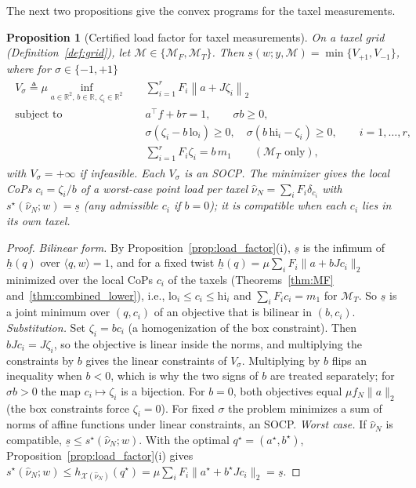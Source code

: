 \documentclass[11pt,a4paper]{article}
\theoremstyle{plain}
\newtheorem{proposition}[theorem]{Proposition}
\newcommand{\R}{\mathbb{R}}
\newcommand{\X}{\mathcal X}
\begin{document}
The next two propositions give the convex programs for the taxel measurements.

\begin{proposition}[Certified load factor for taxel measurements]
\label{prop:load_factor_lower}
    On a taxel grid (Definition~\ref{def:grid}), let $\mathcal M\in\{\mathcal M_F,\mathcal M_T\}$. Then $\underline s(w;y,\mathcal M)=\min\{V_{+1},V_{-1}\}$, where for $\sigma\in\{-1,+1\}$
    \begin{align}
        \boxed{
        \begin{aligned}
        V_\sigma\triangleq\mu\inf_{a\in\R^2,\,b\in\R,\,\zeta_i\in\R^2}\quad&\sum_{i=1}^rF_i\left\|a+J\zeta_i\right\|_2\\
        \text{subject to}\quad&a^\top f+b\tau=1,\qquad\sigma b\ge0,\\
        &\sigma\left(\zeta_i-b\,\mathrm{lo}_i\right)\ge0,\quad\sigma\left(b\,\mathrm{hi}_i-\zeta_i\right)\ge0,\qquad i=1,\ldots,r,\\
        &\textstyle\sum_{i=1}^rF_i\zeta_i=b\,m_1\qquad(\mathcal M_T\text{ only}),
        \end{aligned}}
    \end{align}
    with $V_\sigma=+\infty$ if infeasible. Each $V_\sigma$ is an SOCP. The minimizer gives the local CoPs $c_i=\zeta_i/b$ of a worst-case point load per taxel $\hat\nu_N=\sum_iF_i\delta_{c_i}$ with
    $s^\star(\hat\nu_N;w)=\underline s$ (any admissible $c_i$ if $b=0$); it is compatible when each $c_i$ lies in its own taxel.
\end{proposition}
\begin{proof}
    \emph{Bilinear form.} By Proposition~\ref{prop:load_factor}(i), $\underline s$ is the infimum of $\underline h(q)$ over $\langle q,w\rangle=1$, and for a fixed twist $\underline h(q)=\mu\sum_iF_i\|a+bJc_i\|_2$ minimized
    over the local CoPs $c_i$ of the taxels (Theorems~\ref{thm:MF} and~\ref{thm:combined_lower}), i.e., $\mathrm{lo}_i\le c_i\le\mathrm{hi}_i$ and $\sum_iF_ic_i=m_1$ for $\mathcal M_T$.
    So $\underline s$ is a joint minimum over $(q,c_i)$ of an objective that is bilinear in $(b,c_i)$.
    \emph{Substitution.} Set $\zeta_i=bc_i$ (a homogenization of the box constraint). Then $bJc_i=J\zeta_i$, so the objective is linear inside the norms, and multiplying the constraints by $b$ gives the
    linear constraints of $V_\sigma$. Multiplying by $b$ flips an inequality when $b<0$, which is why the two signs of $b$ are treated separately; for $\sigma b>0$ the map $c_i\mapsto\zeta_i$ is a bijection.
    For $b=0$, both objectives equal $\mu f_N\|a\|_2$ (the box constraints force $\zeta_i=0$). For fixed $\sigma$ the problem minimizes a sum of norms of affine functions under linear constraints, an SOCP.
    \emph{Worst case.} If $\hat\nu_N$ is compatible, $\underline s\le s^\star(\hat\nu_N;w)$. With the optimal $q^\star=(a^\star,b^\star)$, Proposition~\ref{prop:load_factor}(i) gives
    $s^\star(\hat\nu_N;w)\le h_{\X(\hat\nu_N)}(q^\star)=\mu\sum_iF_i\|a^\star+b^\star Jc_i\|_2=\underline s$.
\end{proof}
\end{document}
